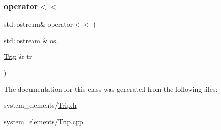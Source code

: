 \subsubsection{\texorpdfstring{operator$<$$<$}{operator<<}}
{\footnotesize\ttfamily std\+::ostream\& operator$<$$<$ (\begin{DoxyParamCaption}\item[{std\+::ostream \&}]{os,  }\item[{\mbox{\hyperlink{classTrip}{Trip}} \&}]{tr }\end{DoxyParamCaption})\hspace{0.3cm}{\ttfamily [friend]}}



The documentation for this class was generated from the following files\+:\begin{DoxyCompactItemize}
\item 
system\+\_\+elements/\mbox{\hyperlink{Trip_8h}{Trip.\+h}}\item 
system\+\_\+elements/\mbox{\hyperlink{Trip_8cpp}{Trip.\+cpp}}\end{DoxyCompactItemize}
